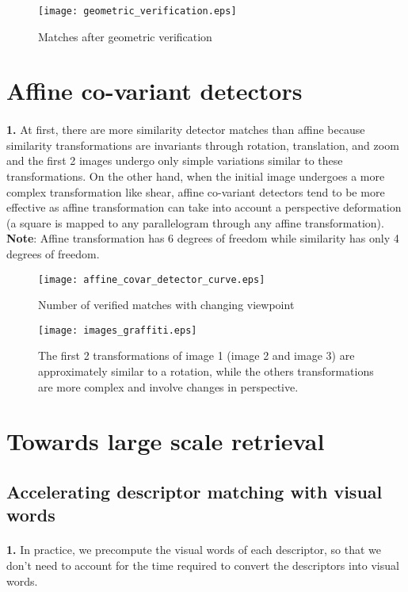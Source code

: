 \documentclass[11pt]{article}
\numberwithin{figure}{section} %
\begin{document}
\begin{figure}[!h] 
  \centering
	\texttt{[image: geometric\_verification.eps]}
  \caption{Matches after geometric verification}
\end{figure}

\newpage

\section{Affine co-variant detectors}
\paragraph{}\textbf{1.} At first, there are more similarity detector matches than affine because similarity transformations are invariants through rotation, translation, and zoom and the first 2 images undergo only simple variations similar to these transformations. On the other hand, when the initial image undergoes a more complex transformation like shear, affine co-variant detectors tend to be more effective as affine transformation can take into account a perspective deformation (a square is mapped to any parallelogram through any affine transformation). \newline
\textbf{Note}: Affine transformation has 6 degrees of freedom while similarity has only 4 degrees of freedom.

\begin{figure}[!h] 
  \centering
	\texttt{[image: affine\_covar\_detector\_curve.eps]}
  \caption{Number of verified matches with changing viewpoint}
\end{figure}

\begin{figure}[!h] 
  \centering
	\texttt{[image: images\_graffiti.eps]}
  \caption{The first 2 transformations of image 1 (image 2 and image 3) are approximately similar to a rotation, while the others transformations are more complex and involve changes in perspective.}
\end{figure}


\section{Towards large scale retrieval}
\subsection{Accelerating descriptor matching with visual words}
\paragraph{}\textbf{1.} In practice, we precompute the visual words of each descriptor, so that we don't need to account for the time required to convert the descriptors into visual words.
\end{document}
